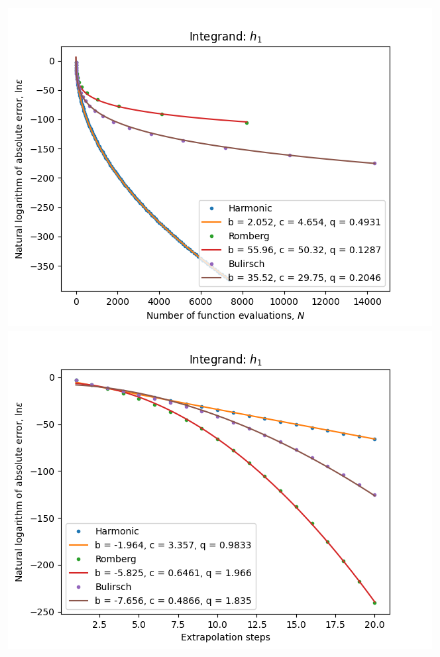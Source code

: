 \begin{figure}[H]
\centering
\begin{minipage}{0.45\textwidth}
\centering
\includegraphics[scale=0.45]{../results/romberg_plots/h_one_hp_trend.png}
\end{minipage}
\begin{minipage}{0.45\textwidth}
\centering
\includegraphics[scale=0.45]{../results/romberg_plots/h_one_hp_steps.png}
\end{minipage}
\end{figure}


